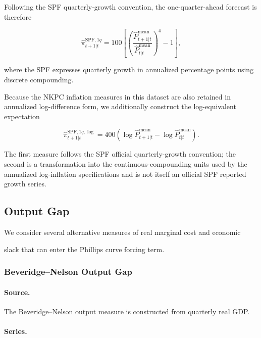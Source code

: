 \documentclass[11pt]{article}
\begin{document}
Following the SPF quarterly-growth convention, the one-quarter-ahead forecast
is therefore

\begin{equation}
\widehat{\pi}_{t+1|t}^{\mathrm{SPF},1q}
=
100\left[
\left(
\frac{\widehat{P}_{t+1|t}^{\mathrm{mean}}}
     {\widehat{P}_{t|t}^{\mathrm{mean}}}
\right)^4-1
\right],
\end{equation}

where the SPF expresses quarterly growth in annualized percentage points using
discrete compounding.

Because the NKPC inflation measures in this dataset are also retained in
annualized log-difference form, we additionally construct the log-equivalent
expectation

\begin{equation}
\widehat{\pi}_{t+1|t}^{\mathrm{SPF},1q,\log}
=
400\left(
\log \widehat{P}_{t+1|t}^{\mathrm{mean}}
-
\log \widehat{P}_{t|t}^{\mathrm{mean}}
\right).
\end{equation}

The first measure follows the SPF official quarterly-growth convention; the
second is a transformation into the continuous-compounding units used by the
annualized log-inflation specifications and is not itself an official SPF
reported growth series.

\subsection{Output Gap}

We consider several alternative measures of real marginal cost and economic

slack that can enter the Phillips curve forcing term.



\subsubsection{Beveridge--Nelson Output Gap}

\paragraph{Source.}

The Beveridge--Nelson output measure is constructed from quarterly real GDP.

\paragraph{Series.}
\end{document}
